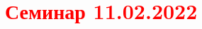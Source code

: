 \documentclass[main.tex]{subfiles}
\begin{document}
\section{\textcolor{red}{Семинар 11.02.2022}}
\end{document}
